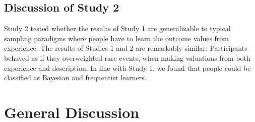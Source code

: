 \documentclass[a4paper, man, natbib, floatsintext]{apa6} %
\begin{document}





\subsection{Discussion of Study 2}
Study 2 tested whether the results of Study 1 are generalizable to typical sampling paradigms where people have to learn the outcome values from experience. The results of Studies 1 and 2 are remarkably similar: Participants behaved as if they overweighted rare events, when making valuations from both experience and description. In line with Study 1, we found that people could be classified as Bayesian and frequentist learners.

\section{General Discussion}
\end{document}
